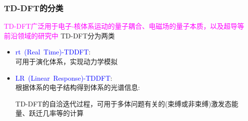 {\frame
{
	\frametitle{\textrm{TD-DFT}的分类}
	\textcolor{magenta}{\textrm{TD-DFT}广泛用于电子-核体系运动的量子耦合、电磁场的量子本质，以及超导等前沿领域的研究中}
	\vskip 5pt
\textrm{TD-DFT}分为两类
\begin{itemize}
	\item \textcolor{blue}{\textrm{rt~(Real~Time)-TDDFT}}:\\
		可用于演化体系，实现动力学模拟\\
{\fontsize{7.2pt}{4.2pt}}
	\item \textcolor{blue}{\textrm{LR~(Linear~Response)-TDDFT}}:\\
		根据体系的电子结构得到体系的光谱信息:\\
		{\fontsize{7.2pt}{4.2pt}\selectfont{不产生体系的动力学演化信息}}
	\begin{itemize}
{\fontsize{7.2pt}{4.2pt}}
	\end{itemize}
	\textrm{TD-DFT}的自洽迭代过程，可用于多体问题有关的(束缚或非束缚)激发态能量、跃迁几率等的计算
\end{itemize}
}

}
